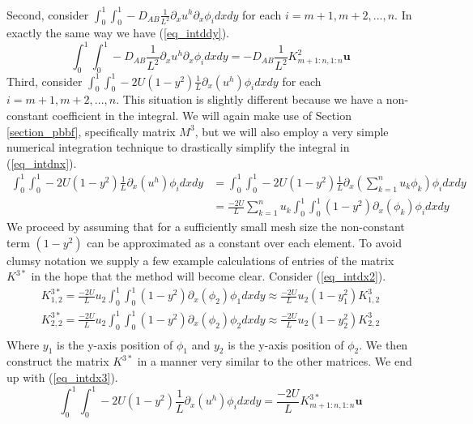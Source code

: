 \documentclass[11pt,fleqn]{article}
\theoremstyle{defstyle}
\begin{document}
Second, consider $\int_0^1 \int_0^1  -D_{AB}\frac{1}{L^2}\partial_x u^h \partial_x \phi_i dxdy$ for each $i=m+1, m+2,...,n$. In exactly the same way we have (\ref{eq_intddy}). 
\begin{equation}
\int_0^1 \int_0^1  -D_{AB}\frac{1}{L^2}\partial_x u^h \partial_x \phi_i dxdy = -D_{AB}\frac{1}{L^2}K^2_{m+1:n, 1:n}\mathbf{u}
\label{eq_intddy}
\end{equation}
Third, consider $\int_0^1 \int_0^1 - 2U(1-y^2)\frac{1}{L}\partial_x(u^h)  \phi_idxdy$ for each $i=m+1, m+2,...,n$. This situation is slightly different because we have a non-constant coefficient in the integral. We will again make use of Section \ref{section_pbbf}, specifically matrix $M^3$, but we will also employ a very simple numerical integration technique to drastically simplify the integral in (\ref{eq_intdnx}).
\begin{equation}
\begin{aligned}
\int_0^1 \int_0^1 - 2U(1-y^2)\frac{1}{L}\partial_x(u^h)  \phi_idxdy &= \int_0^1 \int_0^1 - 2U(1-y^2)\frac{1}{L}\partial_x(\sum^n_{k=1} u_k \phi_k)  \phi_idxdy \\
& = \frac{-2U}{L}\sum^n_{k=1} u_k \int_0^1 \int_0^1 (1-y^2) \partial_x(\phi_k)  \phi_idxdy
\end{aligned}
\label{eq_intdnx}
\end{equation}
We proceed by assuming that for a sufficiently small mesh size the non-constant term $(1-y^2)$ can be approximated as a constant over each element. To avoid clumsy notation we supply a few example calculations of entries of the matrix $K^{3*}$ in the hope that the method will become clear. Consider (\ref{eq_intdx2}). 
\begin{equation}
\begin{aligned}
K^{3*}_{1,2} = \frac{-2U}{L} u_2 \int_0^1 \int_0^1 (1-y^2) \partial_x(\phi_2)  \phi_1dxdy \approx \frac{-2U}{L} u_2 (1-y_1^2)K^3_{1,2} \\
K^{3*}_{2,2} = \frac{-2U}{L} u_2 \int_0^1 \int_0^1 (1-y^2) \partial_x(\phi_2)  \phi_2dxdy \approx \frac{-2U}{L} u_2 (1-y_2^2)K^3_{2,2} \\ 
\end{aligned}
\label{eq_intdx2}
\end{equation}
Where $y_1$ is the y-axis position of $\phi_1$ and $y_2$ is the y-axis position of $\phi_2$. We then construct the matrix $K^{3*}$ in a manner very similar to the other matrices. We end up with (\ref{eq_intdx3}).
\begin{equation}
\int_0^1 \int_0^1 - 2U\left(1-y^2\right)\frac{1}{L}\partial_x(u^h)  \phi_idxdy  = \frac{-2U}{L} K^{3*}_{m+1:n,1:n}\mathbf{u}
\label{eq_intdx3}
\end{equation}
\end{document}

